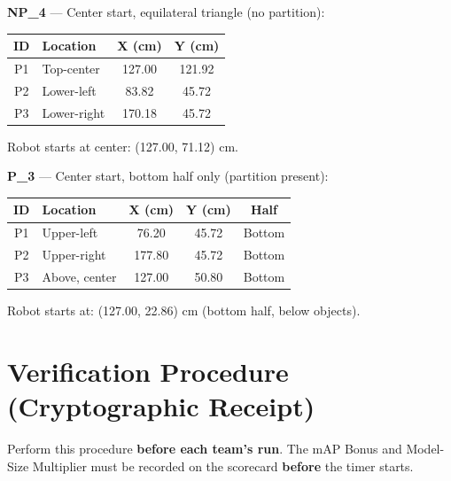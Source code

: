 \documentclass[a4]{article}
\begin{document}
\textbf{NP\_4} --- Center start, equilateral triangle (no partition):

\begin{table}[H]
\centering
\begin{tabular}{clcc}
\toprule
\textbf{ID} & \textbf{Location} & \textbf{X (cm)} & \textbf{Y (cm)} \\
\midrule
P1 & Top-center & 127.00 & 121.92 \\
P2 & Lower-left & 83.82 & 45.72 \\
P3 & Lower-right & 170.18 & 45.72 \\
\bottomrule
\end{tabular}
\end{table}

Robot starts at center: (127.00, 71.12) cm.

\textbf{P\_3} --- Center start, bottom half only (partition present):

\begin{table}[H]
\centering
\begin{tabular}{clccc}
\toprule
\textbf{ID} & \textbf{Location} & \textbf{X (cm)} & \textbf{Y (cm)} & \textbf{Half} \\
\midrule
P1 & Upper-left & 76.20 & 45.72 & Bottom \\
P2 & Upper-right & 177.80 & 45.72 & Bottom \\
P3 & Above, center & 127.00 & 50.80 & Bottom \\
\bottomrule
\end{tabular}
\end{table}

Robot starts at: (127.00, 22.86) cm (bottom half, below objects).

\pagebreak
\section*{Verification Procedure (Cryptographic Receipt)}

Perform this procedure \textbf{before each team's run}. The mAP Bonus and Model-Size Multiplier must be recorded on the scorecard \textbf{before} the timer starts.
\end{document}
